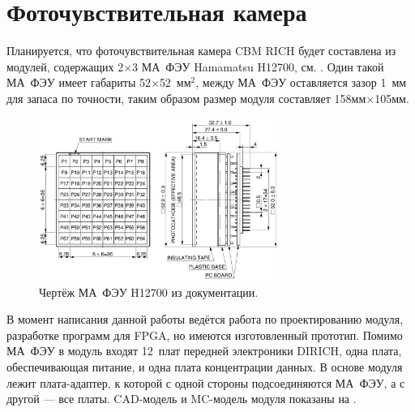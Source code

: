 \section{Фоточувствительная камера}\label{sec:RICHgeoCamera}

Планируется, что фоточувствительная камера CBM RICH будет составлена из модулей, содержащих 2$\times$3 МА~ФЭУ Hamamatsu H12700, см. . Один такой МА~ФЭУ имеет габариты 52$\times$52~мм$^2$, между МА~ФЭУ оставляется зазор 1~мм для запаса по точности, таким образом размер модуля составляет 158мм$\times$105мм.

\begin{figure}[H]
\centering
\includegraphics[width=0.7\textwidth]{pictures/H12700_drawing.png}
\caption{Чертёж МА~ФЭУ H12700 из документации.}
\label{fig:H12700drawing}
\end{figure}

В момент написания данной работы ведётся работа по проектированию модуля, разработке программ для FPGA, но имеются изготовленный прототип. Помимо МА~ФЭУ в модуль входят 12~плат передней электроники DIRICH, одна плата, обеспечивающая питание, и одна плата концентрации данных. В основе модуля лежит плата-адаптер, к которой с одной стороны подсоединяются МА~ФЭУ, а с другой --- все платы. CAD-модель и MC-модель модуля показаны на .

